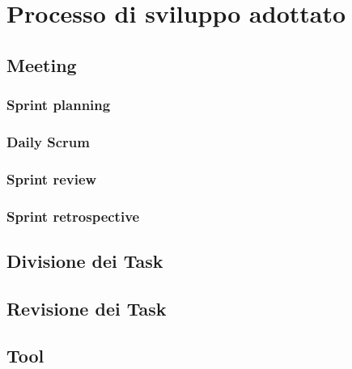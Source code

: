 \section{Processo di sviluppo adottato}

\subsection{Meeting}

\subsubsection{Sprint planning}

\subsubsection{Daily Scrum}

\subsubsection{Sprint review}

\subsubsection{Sprint retrospective}

\subsection{Divisione dei Task}

\subsection{Revisione dei Task}

\subsection{Tool}